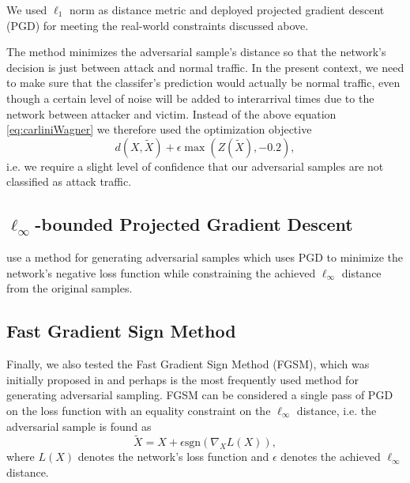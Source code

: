 \documentclass[sigconf,nonacm]{acmart}
\begin{document}
We used $\ell_1$ norm as distance metric and deployed projected gradient descent (PGD) for meeting the real-world constraints discussed above.

The method minimizes the adversarial sample's distance so that the network's decision is just between attack and normal traffic. In the present context, we need to make sure that the classifer's prediction would actually be normal traffic, even though a certain level of noise will be added to interarrival times due to the network between attacker and victim. Instead of the above equation \ref{eq:carliniWagner} we therefore used the optimization objective
\begin{equation} 
d(X,\tilde X) + \epsilon  \max(Z(\tilde X), -0.2),
\end{equation}
i.e. we require a slight level of confidence that our adversarial samples are not classified as attack traffic.

\subsection{$\ell_\infty$-bounded Projected Gradient Descent}
\cite{madry2017towards} use a method for generating adversarial samples which uses PGD  to minimize the network's negative loss function while constraining the achieved $\ell_\infty$ distance from the original samples. 

\subsection{Fast Gradient Sign Method}
Finally, we also tested the Fast Gradient Sign Method (FGSM), which was initially proposed in \cite{goodfellow2014explaining} and perhaps is the most frequently used method for generating adversarial sampling. FGSM can be considered a single pass of PGD on the loss function with an equality constraint on the $\ell_\infty$ distance, i.e. the adversarial sample is found as
\begin{equation}
\tilde X = X + \epsilon \text{sgn}( \nabla_X L(X)),
\end{equation}
where $L(X)$ denotes the network's loss function and $\epsilon$ denotes the achieved $\ell_\infty$ distance.
\end{document}

